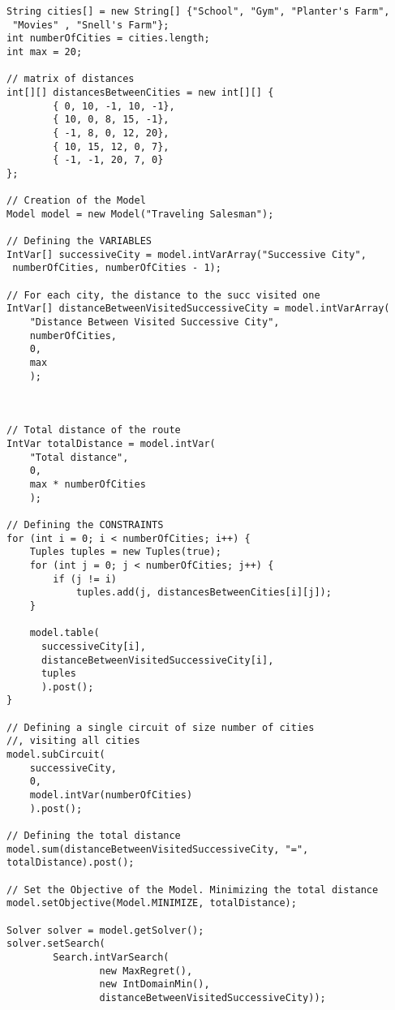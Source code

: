 \documentclass[runningheads,a4paper,english]{llncs}[2022/01/12]
\begin{document}
\begin{verbatim}
String cities[] = new String[] {"School", "Gym", "Planter's Farm",
 "Movies" , "Snell's Farm"};
int numberOfCities = cities.length;
int max = 20;
      
// matrix of distances
int[][] distancesBetweenCities = new int[][] {
        { 0, 10, -1, 10, -1},
        { 10, 0, 8, 15, -1},
        { -1, 8, 0, 12, 20},
        { 10, 15, 12, 0, 7},
        { -1, -1, 20, 7, 0}
};

// Creation of the Model
Model model = new Model("Traveling Salesman");

// Defining the VARIABLES
IntVar[] successiveCity = model.intVarArray("Successive City",
 numberOfCities, numberOfCities - 1);

// For each city, the distance to the succ visited one
IntVar[] distanceBetweenVisitedSuccessiveCity = model.intVarArray(
    "Distance Between Visited Successive City",
    numberOfCities,
    0,
    max
    );



// Total distance of the route
IntVar totalDistance = model.intVar(
    "Total distance",
    0,
    max * numberOfCities
    );

// Defining the CONSTRAINTS
for (int i = 0; i < numberOfCities; i++) {
    Tuples tuples = new Tuples(true);
    for (int j = 0; j < numberOfCities; j++) {
        if (j != i)
            tuples.add(j, distancesBetweenCities[i][j]);
    }

    model.table(
      successiveCity[i],
      distanceBetweenVisitedSuccessiveCity[i],
      tuples
      ).post();
}

// Defining a single circuit of size number of cities
//, visiting all cities
model.subCircuit(
    successiveCity,
    0, 
    model.intVar(numberOfCities)
    ).post();

// Defining the total distance
model.sum(distanceBetweenVisitedSuccessiveCity, "=", totalDistance).post();

// Set the Objective of the Model. Minimizing the total distance
model.setObjective(Model.MINIMIZE, totalDistance);

Solver solver = model.getSolver();
solver.setSearch(
        Search.intVarSearch(
                new MaxRegret(),
                new IntDomainMin(),
                distanceBetweenVisitedSuccessiveCity));
\end{verbatim}

\newpage
\end{document}
